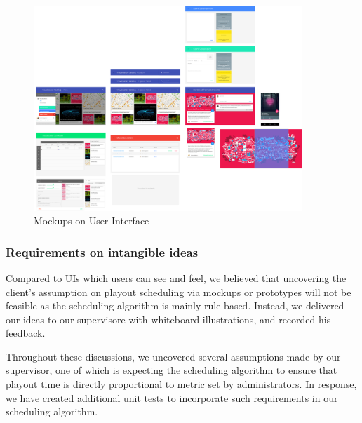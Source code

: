 \documentclass[a4paper, titlepage]{article}
\begin{document}
\begin{figure}[h!]
   \begin{center}
      \includegraphics[width = 0.9\textwidth, trim = 0 0 0 0cm, clip]{./eval/mockup.png}
   \end{center}
   \caption{Mockups on User Interface}
   \label{fig:eval_mockup}
\end{figure}

\subsubsection{Requirements on intangible ideas}

Compared to UIs which users can see and feel, we believed that uncovering the client's assumption on playout scheduling via mockups or prototypes will not be feasible as the scheduling algorithm is mainly rule-based. Instead, we delivered our ideas to our supervisore with whiteboard illustrations, and recorded his feedback.

Throughout these discussions, we uncovered several assumptions made by our supervisor, one of which is expecting the scheduling algorithm to ensure that playout time is directly proportional to metric set by administrators. In response, we have created additional unit tests to incorporate such requirements in our scheduling algorithm.
\end{document}
